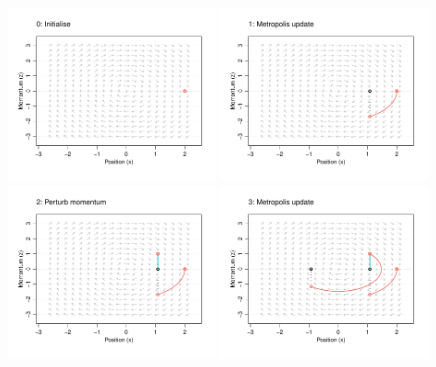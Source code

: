 \begin{figure}[p]
  \vspace{-10pt}
  \includegraphics[width=0.49\textwidth]{figure/04-phase1}
  \vspace{-20pt}
  \includegraphics[width=0.49\textwidth]{figure/04-phase2}
  \vspace{-20pt}
  \includegraphics[width=0.49\textwidth]{figure/04-phase3}
  \includegraphics[width=0.49\textwidth]{figure/04-phase4}

\end{figure}
